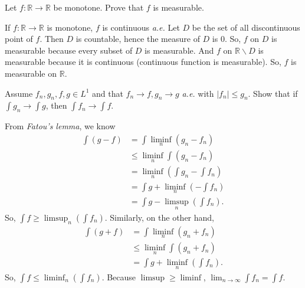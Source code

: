 \documentclass[11pt]{article}
\numberwithin{equation}{section}
\newcounter{exercise}[section]
\newenvironment{exercise}[1][\textsc{Exercise }\thesection.\refstepcounter{exercise}\theexercise]{\begin{tcolorbox}[colback=black!15, colframe=black!80, breakable, title=\textsc{Exercise }#1]}{\end{tcolorbox}}
\newenvironment{solution}{\begin{tcolorbox}[colback=white, colframe=black!50, breakable, title=Solution. ]\setlength{\parskip}{0.8em}}{\end{tcolorbox}}
\begin{document}
        \begin{exercise}[(4)]
            Let $f: \mathbb{R}\to\mathbb{R}$ be monotone. Prove that $f$ is measurable. 
        \end{exercise}

        \begin{solution}
            If $f:\mathbb{R}\to\mathbb{R}$ is monotone, $f$ is continuous \emph{a.e.} Let $D$ be the set of all discontinuous point of $f$. Then $D$ is countable, hence the measure of $D$  is 0. So, $f$ on $D$ is measurable because every subset of $D$ is measurable. And $f$ on $\mathbb{R}\backslash D$ is measurable because it is continuous (continuous function is measurable). So, $f$ is measurable on $\mathbb{R}$. 
        \end{solution}
    
        \begin{exercise}[(5)] 
            Assume $f_{n}, g_{n}, f, g \in L^{1}$ and that $f_{n} \rightarrow f, g_{n} \rightarrow g$ \emph{a.e.} with $\left|f_{n}\right| \leq g_{n}$. Show that if $\int g_{n} \rightarrow \int g$, then $\int f_{n} \rightarrow \int f$. 
        \end{exercise}

        \begin{solution}
            From \emph{Fatou's lemma}, we know 
            \begin{align*}
                    \int(g-f)
                    &=\int \liminf _{n}\left(g_{n}-f_{n}\right) \\
                    &\leqslant \liminf _{n} \int\left(g_{n}-f_{n}\right)\\
                    &=\liminf _{n}\left(\int g_{n}-\int f_{n}\right) \\
                    &=\int g+\liminf _{n} \left(-\int f_{n}\right)\\
                    &=\int g-\limsup _{n} \left(\int f_{n}\right). 
            \end{align*}
            So, $\int f\geqslant\limsup_n\left(\int f_n\right)$. Similarly, on the other hand, 
            \begin{align*}
                \int(g+f)
                &=\int \liminf _{n}\left(g_{n}+f_{n}\right) \\
                &\leqslant \liminf _{n} \int\left(g_{n}+f_{n}\right)\\
                &=\int g+\liminf _{n} \left(\int f_{n}\right). 
            \end{align*}
            So, $\int f\leqslant\liminf _{n} \left(\int f_{n}\right)$. Because $\limsup\geqslant\liminf$, $\lim_{n\to\infty}\int f_n=\int f$. 
        \end{solution}
        
\end{document}
